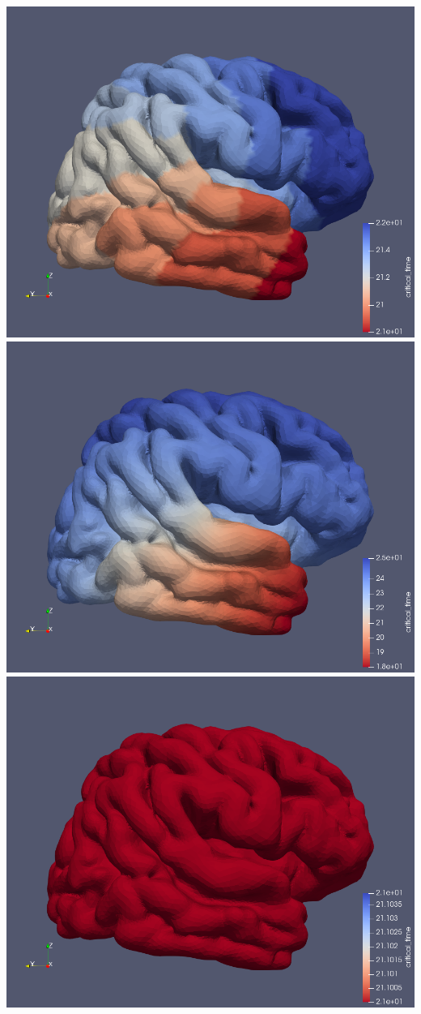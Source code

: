 \documentclass[12pt, letterpaper]{article}
\begin{document}
\noindent\includegraphics[scale=0.1]{pics/base.png}
\includegraphics[scale=0.1]{pics/reddiff.png}
\includegraphics[scale=0.1]{pics/incdiff.png}
\end{document}
